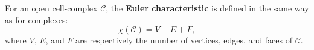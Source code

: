 For an open cell-complex $\mathcal{C}$, the \textbf{Euler characteristic} is defined in the same way as for complexes:
$$
\chi(\mathcal{C}) = V - E + F,
$$
where $V$, $E$, and $F$ are respectively the number of vertices, edges, and faces of $\mathcal{C}$.
